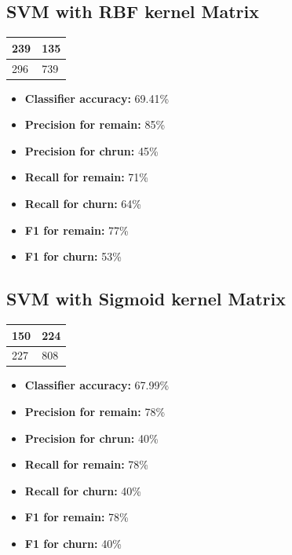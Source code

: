 \documentclass[12pt]{article}
\begin{document}
\newpage

\subsection{SVM with RBF kernel Matrix}
\begin{table}[ht]
  \large
  \centering
\begin{tabular}{|l|l|}
  \hline
  239 & 135\\
  \hline
  296 & 739\\
  \hline
\end{tabular}
\end{table}
\begin{itemize}
  \item \textbf{Classifier accuracy:} 69.41\%
  \item \textbf{Precision for remain:} 85\%
  \item \textbf{Precision for chrun:} 45\%
  \item \textbf{Recall for remain:} 71\%
  \item \textbf{Recall for churn:} 64\%
  \item \textbf{F1 for remain:} 77\%
  \item \textbf{F1 for churn:} 53\%
\end{itemize}

\vspace{\baselineskip}

\subsection{SVM with Sigmoid kernel Matrix}
\begin{table}[ht]
  \large
  \centering
\begin{tabular}{|l|l|}
  \hline
  150 & 224\\
  \hline
  227 & 808\\
  \hline
\end{tabular}
\end{table}
\begin{itemize}
  \item \textbf{Classifier accuracy:} 67.99\%
  \item \textbf{Precision for remain:} 78\%
  \item \textbf{Precision for chrun:} 40\%
  \item \textbf{Recall for remain:} 78\%
  \item \textbf{Recall for churn:} 40\%
  \item \textbf{F1 for remain:} 78\%
  \item \textbf{F1 for churn:} 40\%
\end{itemize}
\end{document}
